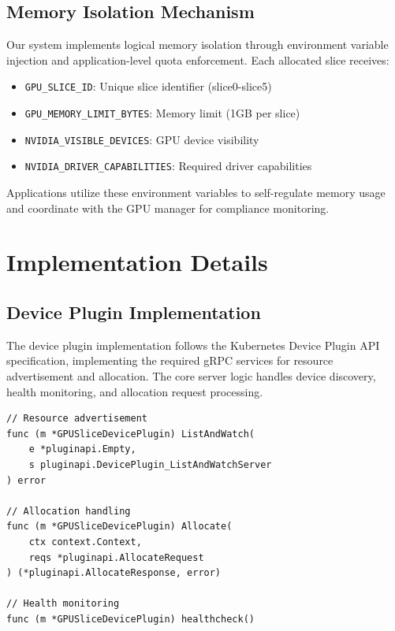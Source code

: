 \documentclass[10pt,twocolumn,letterpaper]{article}
\begin{document}
\subsection{Memory Isolation Mechanism}

Our system implements logical memory isolation through environment variable injection and application-level quota enforcement. Each allocated slice receives:

\begin{itemize}
\item \texttt{GPU\_SLICE\_ID}: Unique slice identifier (slice0-slice5)
\item \texttt{GPU\_MEMORY\_LIMIT\_BYTES}: Memory limit (1GB per slice)
\item \texttt{NVIDIA\_VISIBLE\_DEVICES}: GPU device visibility
\item \texttt{NVIDIA\_DRIVER\_CAPABILITIES}: Required driver capabilities
\end{itemize}

Applications utilize these environment variables to self-regulate memory usage and coordinate with the GPU manager for compliance monitoring.

\section{Implementation Details}

\subsection{Device Plugin Implementation}

The device plugin implementation follows the Kubernetes Device Plugin API specification, implementing the required gRPC services for resource advertisement and allocation. The core server logic handles device discovery, health monitoring, and allocation request processing.

\begin{lstlisting}[caption=Device Plugin Core Functions,basicstyle=\ttfamily\tiny]
// Resource advertisement
func (m *GPUSliceDevicePlugin) ListAndWatch(
    e *pluginapi.Empty, 
    s pluginapi.DevicePlugin_ListAndWatchServer
) error

// Allocation handling  
func (m *GPUSliceDevicePlugin) Allocate(
    ctx context.Context, 
    reqs *pluginapi.AllocateRequest
) (*pluginapi.AllocateResponse, error)

// Health monitoring
func (m *GPUSliceDevicePlugin) healthcheck()
\end{lstlisting}
\end{document}
